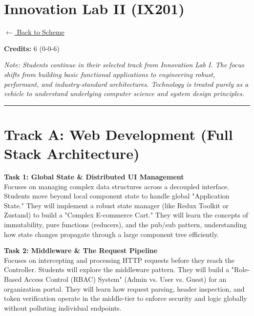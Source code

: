 \section*{Innovation Lab II (IX201)}
\label{course:IX201}

\noindent \small{\hyperref[main:scheme]{$\leftarrow$ Back to Scheme}} \vspace{0.5cm}

\noindent \textbf{Credits:} 6 (0-0-6)

\noindent \textit{Note: Students continue in their selected track from Innovation Lab I. The focus shifts from building basic functional applications to engineering robust, performant, and industry-standard architectures. Technology is treated purely as a vehicle to understand underlying computer science and system design principles.}

\vspace{0.5cm}
\hrule
\vspace{0.5cm}

\section*{Track A: Web Development (Full Stack Architecture)}

\noindent\textbf{Task 1: Global State \& Distributed UI Management} \\
Focuses on managing complex data structures across a decoupled interface. Students move beyond local component state to handle global "Application State." They will implement a robust state manager (like Redux Toolkit or Zustand) to build a "Complex E-commerce Cart." They will learn the concepts of immutability, pure functions (reducers), and the pub/sub pattern, understanding how state changes propagate through a large component tree efficiently.

\vspace{0.3cm}

\noindent\textbf{Task 2: Middleware \& The Request Pipeline} \\
Focuses on intercepting and processing HTTP requests before they reach the Controller. Students will explore the middleware pattern. They will build a "Role-Based Access Control (RBAC) System" (Admin vs. User vs. Guest) for an organization portal. They will learn how request parsing, header inspection, and token verification operate in the middle-tier to enforce security and logic globally without polluting individual endpoints.


